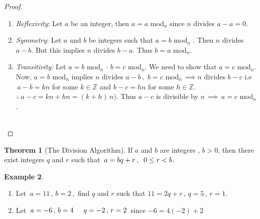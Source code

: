 \documentclass[11pt,a4paper]{article}
\theoremstyle{definition}
\newtheorem{thm}{Theorem}[subsection]
\newtheorem{exa}[thm]{Example}
\begin{document}
\begin{proof}
\begin{enumerate}
\item[•] \textit{Reflexivity}: Let $a$ be an integer, then $a=a$ mod$_n$ since $n$ divides $a - a = 0$.
\item[•] \textit{Symmetry}: Let $a$ and $b$ be integers such that $a=b$ mod$_n$ . Then $n$ divides $a - b$. But this implies $n$ divides $b-a$. Thus $b = a$ mod$_n$.
\item[•]\textit{Transitivity:} Let $a = b$ mod$_n\, \cdot\, b = c$ mod$_n$. We need to show that $a = c$ mod$_n$. Now, $a = b$ mod$_n$ implies $n$ divides $a - b\, ,\,\, b = c$ mod$_n\, \implies n$ divides $b-c$ i.e $\, a - b = kn$ for some $k\in \mathbb{Z}$ and $b  - c = hn$ for some $h\in \mathbb{Z}$.\\
$\therefore\, a - c = kn + hn = (k+h)\, n).$ Thus $a-c$ is divisible by $n\, \implies\, a = c$ mod$_n$.\\\\
\end{enumerate}
\end{proof}







\begin{thm}[The Division Algorithm]
If $a$ and $b$ are integers $  , \, b>0$, then there exist integers $q$ and $r$ such that $\, a = bq + r\, , \hspace{0.2cm} 0 \leq r < b$.\\
\end{thm}






\begin{exa}
\begin{enumerate}
\item Let $\, a = 11\, , \, b = 2\, , $ find $q$ and $r$ such that $ 11 = 2q + r\, , \, q = 5\, ,\, r = 1$.
\item Let $\, a = -6\, , \, b = 4\hspace{0.5cm} q = -2\, , \, r = 2\,$ since $-6 = 4(-2) + 2$\\
\end{enumerate}
\end{exa}
\end{document}
